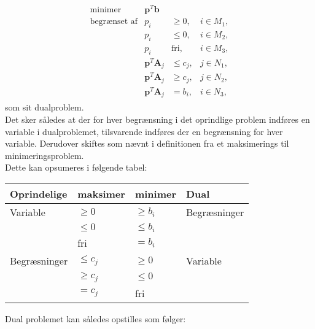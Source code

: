 \begin{align*}
\begin{array}{lrll}
\text{minimer}		&\textbf{p}^T\textbf{b}	&			&\\
\text{begrænset af}	&p_i					&\geq 0,	&i \in M_1,\\
					&p_i					&\leq 0,	&i \in M_2,\\
					&p_i					&\text{fri},	&i \in M_3,\\
					&\textbf{p}^T\textbf{A}_j	&\leq c_j,	&j \in N_1,\\
					&\textbf{p}^T\textbf{A}_j	&\geq c_j,	&j \in N_2,\\
					&\textbf{p}^T\textbf{A}_j	& = b_i,	&i \in N_3,
\end{array}
\end{align*}
som sit dualproblem.
\\
Det sker således at der for hver begrænsning i det oprindlige problem indføres en variable i dualproblemet, tilsvarende indføres der en begrænsning for hver variable. 
Derudover skiftes som nævnt i definitionen fra et maksimerings til minimeringsproblem. \\
Dette kan opsumeres i følgende tabel: \\
\begin{table}[H]
\begin{center}
\begin{tabular}{llll}
Oprindelige  & maksimer   & minimer    & Dual         \\
\hline
Variable     & $\geq 0$   & $\geq b_i$ & Begræsninger \\
             & $\leq 0$   & $\leq b_i$ &              \\
             & fri        & $=b_i$     &              \\
\hline
Begræsninger & $\leq c_j$ & $\geq 0$   & Variable     \\
             & $\geq c_j$ & $\leq 0$   &              \\
             & $=c_j$     & fri        &             
\end{tabular}
\end{center}
\end{table}
\noindent
Dual problemet kan således opstilles som følger:
